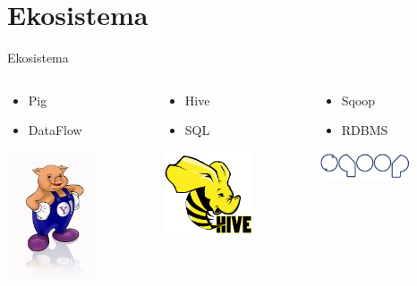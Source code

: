 \documentclass{beamer}
\begin{document}
  \section{Ekosistema}
  \begin{frame}[allowframebreaks=0.8]{Ekosistema}
    \begin{columns}
      \begin{column}{0.3\textwidth}
        \begin{itemize}
          \item Pig
          \item DataFlow
        \end{itemize}
        \includegraphics[width=100px]{img/yahoopig.jpeg}
      \end{column}
      \begin{column}{0.3\textwidth}
        \begin{itemize}
          \item Hive
          \item SQL
        \end{itemize}
        \includegraphics[width=100px]{img/hive.png}
        \vspace{45px}
      \end{column}
      \begin{column}{0.3\textwidth}
        \begin{itemize}
          \item Sqoop
          \item RDBMS
        \end{itemize}
        \includegraphics[width=100px]{img/sqoop.png}
        \vspace{110px}
      \end{column}
    \end{columns}


\end{frame}
\end{document}
